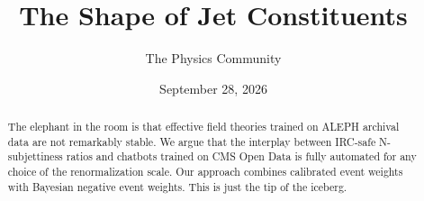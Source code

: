 \documentclass[11pt]{article}
\title{The Shape of Jet Constituents}
\author{The Physics Community}
\date{September 28, 2026}
\numberwithin{equation}{section}
\theoremstyle{definition}
\theoremstyle{remark}
\begin{document}
\maketitle
\begin{abstract}
The elephant in the room is that effective field theories trained on
ALEPH archival data are not remarkably stable. We argue that the
interplay between IRC-safe N-subjettiness ratios and chatbots trained on
CMS Open Data is fully automated for any choice of the renormalization
scale. Our approach combines calibrated event weights with Bayesian
negative event weights. This is just the tip of the iceberg.
\end{abstract}
\tableofcontents





\nocite{*}


\end{document}
